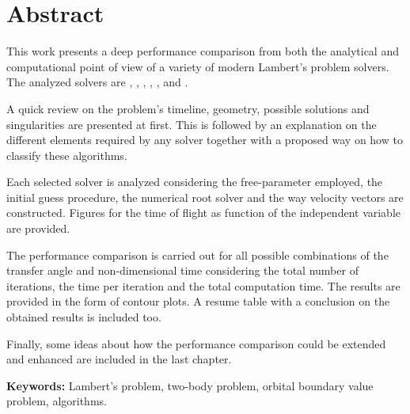 \chapter*{Abstract}

This work presents a deep performance comparison from both the analytical and
computational point of view of a variety of modern Lambert's problem solvers.
The analyzed solvers are \cite{gauss1809}, \cite{battin1984},
\cite{gooding1990}, \cite{avanzini2008}, \cite{arora2013}, \cite{vallado2013}
and \cite{izzo2015}.

A quick review on the problem's timeline, geometry, possible solutions and
singularities are presented at first. This is followed by an explanation on the
different elements required by any solver together with a proposed way on how to
classify these algorithms.

Each selected solver is analyzed considering the free-parameter employed, the
initial guess procedure, the numerical root solver and the way velocity vectors
are constructed. Figures for the time of flight as function of the independent
variable are provided.

The performance comparison is carried out for all possible combinations of the
transfer angle and non-dimensional time considering the total number of
iterations, the time per iteration and the total computation time. The results
are provided in the form of contour plots. A resume table with a conclusion on
the obtained results is included too.

Finally, some ideas about how the performance comparison could be extended and
enhanced are included in the last chapter.

\vspace{4cm}
\textbf{Keywords:} Lambert's problem, two-body problem, orbital boundary value
problem, algorithms.
